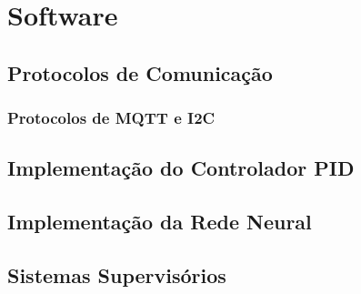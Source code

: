 \section{Software}

\subsection{Protocolos de Comunicação}
\subsubsection{Protocolos de MQTT e I2C}

\subsection{Implementação do Controlador PID}

\subsection{Implementação da Rede Neural}

\subsection{Sistemas Supervisórios}
